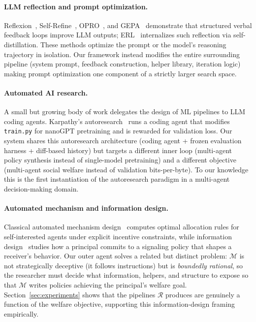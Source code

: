 \documentclass{article}
\newcommand{\cR}{\mathcal{R}}
\newcommand{\cM}{\mathcal{M}}
\begin{document}
\paragraph{LLM reflection and prompt optimization.}
Reflexion~\cite{shinn2023}, Self-Refine~\cite{madaan2023}, OPRO~\cite{yang2024}, and GEPA~\cite{agrawal2026} demonstrate that structured verbal feedback loops improve LLM outputs; ERL~\cite{shi2026} internalizes such reflection via self-distillation. These methods optimize the prompt or the model's reasoning trajectory in isolation. Our framework instead modifies the entire surrounding pipeline (system prompt, feedback construction, helper library, iteration logic) making prompt optimization one component of a strictly larger search space. %

\paragraph{Automated AI research.}
A small but growing body of work delegates the design of ML pipelines to LLM coding agents. Karpathy's autoresearch~\cite{karpathy2026} runs a coding agent that modifies \texttt{train.py} for nanoGPT pretraining and is rewarded for validation loss. Our system shares this autoresearch architecture (coding agent + frozen evaluation harness + diff-based history) but targets a different inner loop (multi-agent policy synthesis instead of single-model pretraining) and a different objective (multi-agent social welfare instead of validation bits-per-byte). To our knowledge this is the first instantiation of the autoresearch paradigm in a multi-agent decision-making domain.

\paragraph{Automated mechanism and information design.}
Classical automated mechanism design~\cite{conitzer2002} computes optimal allocation rules for self-interested agents under explicit incentive constraints, while information design~\cite{kamenica2011} studies how a principal commits to a signaling policy that shapes a receiver's behavior. Our outer agent solves a related but distinct problem: $\cM$ is not strategically deceptive (it follows instructions) but is \emph{boundedly rational}, so the researcher must decide what information, helpers, and structure to expose so that $\cM$ writes policies achieving the principal's welfare goal. Section~\ref{sec:experiments} shows that the pipelines $\cR$ produces are genuinely a function of the welfare objective, supporting this information-design framing empirically.
\end{document}
